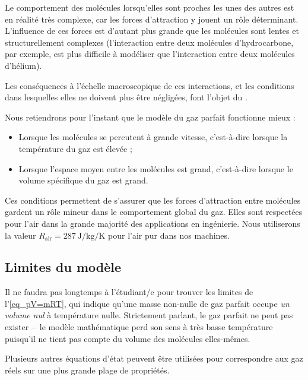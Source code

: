 		Le comportement des molécules lorsqu’elles sont proches les unes des autres est en réalité très complexe, car les forces d’attraction y jouent un rôle déterminant. L’influence de ces forces est d’autant plus grande que les molécules sont lentes et structurellement complexes (l’interaction entre deux molécules d’hydrocarbone, par exemple, est plus difficile à modéliser que l’interaction entre deux molécules d’hélium).

		Les conséquences à l’échelle macroscopique de ces interactions, et les conditions dans lesquelles elles ne doivent plus être négligées, font l’objet du \courscinq.

		Nous retiendrons pour l’instant que le modèle du gaz parfait fonctionne mieux :

		\begin{itemize}
			\item Lorsque les molécules se percutent à grande vitesse, c’est-à-dire lorsque la température du gaz est élevée ;
			\item Lorsque l’espace moyen entre les molécules est grand, c’est-à-dire lorsque le volume spécifique du gaz est grand.
		\end{itemize}
		
		Ces conditions permettent de s’assurer que les forces d’attraction entre molécules gardent un rôle mineur dans le comportement global du gaz. Elles sont respectées pour l’air dans la grande majorité des applications en ingénierie. Nous utiliserons la valeur $R_\text{air} = \SI{287}{\joule\per\kilogram\per\kelvin}$ pour l’air pur dans nos machines.


	\subsection{Limites du modèle}

		Il ne faudra pas longtemps à l’étudiant/e pour trouver les limites de l’\cref{eq_pV=mRT}, qui indique qu’une masse non-nulle de gaz parfait occupe \textit{un volume nul} à température nulle. Strictement parlant, le gaz parfait ne peut pas exister --\ le modèle mathématique perd son sens à très basse température puisqu’il ne tient pas compte du volume des molécules elles-mêmes.

		Plusieurs autres équations d’état peuvent être utilisées pour correspondre aux gaz réels sur une plus grande plage de propriétés.

